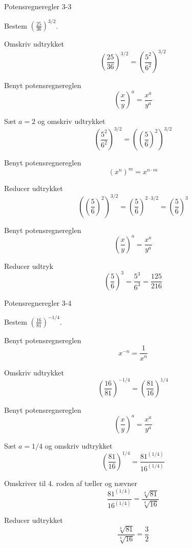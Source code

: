 \documentclass{article}
\begin{document}
\newpage

\begin{exercise}{Potensregneregler 3-3}
	
	Bestem $\left(\frac{25}{36}\right)^{3/2}$.
	
	
	\hint
	
	Omskriv udtrykket
	\[
	\left(\frac{25}{36}\right)^{3/2}= \left(\frac{5^2}{6^2}\right)^{3/2}
	\]
	
	\hint
	
	Benyt potensregnereglen
	\[
	\left(\frac{x}{y}\right)^a = \frac{x^a}{y^a}
	\]
	
	\hint
	
	Sæt $a=2$ og omskriv udtrykket
	\[
	\left(\frac{5^2}{6^2}\right)^{3/2} = \left({\left(\frac{5}{6}\right)^2} \right)^{3/2}
	\]
	
	\hint
	
	Benyt potensregnereglen
	\[
	(x^n)^m = x^{n \cdot m}
	\]
	
	\hint
	
	Reducer udtrykket
	\[
	 \left({\left(\frac{5}{6}\right)^2} \right)^{3/2} = \left(\frac{5}{6}\right)^{2 \cdot 3/2} = \left(\frac{5}{6}\right)^{3} 
	\]
	
	\hint
	
	Benyt potensregnereglen
	\[
	\left(\frac{x}{y}\right)^a = \frac{x^a}{y^a}
	\]
	
	\hint
	
	Reducer udtryk
	\[
	\left(\frac{5}{6}\right)^{3} = \frac{5^3}{6^3} = \frac{125}{216}
	\]
	
\end{exercise}

\newpage

\begin{exercise}{Potensregneregler 3-4}
	
	Bestem $\left(\frac{16}{81}\right)^{-1/4}$.
	
	
	\hint

	Benyt potensregnereglen
	\[
	x^{-n} = \frac{1}{x^n}
	\]
	
	\hint
	
	Omskriv udtrykket
	\[
	\left(\frac{16}{81}\right)^{-1/4}= \left(\frac{81}{16}\right)^{1/4}
	\]
	
	\hint
	
	Benyt potensregnereglen
	\[
	\left(\frac{x}{y}\right)^a = \frac{x^a}{y^a}
	\]
	
	\hint
	
	Sæt $a=1/4$ og omskriv udtrykket
	\[
	\left(\frac{81}{16}\right)^{1/4} = \frac{81^{\left(1/4\right)}}{16^{\left(1/4\right)}}
	\]
	
	\hint
	
	Omskriver til 4. roden af tæller og nævner
	\[
	\frac{81^{\left(1/4\right)}}{16^{\left(1/4\right)}} = \frac{\sqrt[4]{81}}{\sqrt[4]{16}}
	\]
	
	\hint
	
	Reducer udtrykket
	\[
	\frac{\sqrt[4]{81}}{\sqrt[4]{16}} = \frac{3}{2}
	\]
	
	
\end{exercise}
\end{document}
